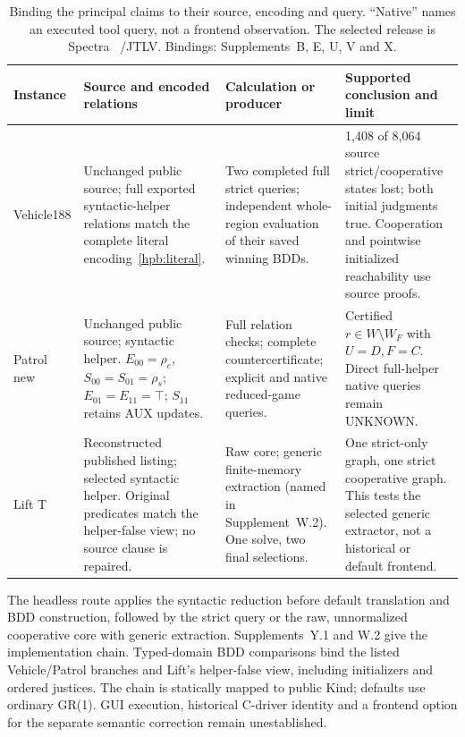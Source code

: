 \begin{table}[t]
\centering\small
\caption{Binding the principal claims to their source, encoding and query.
``Native'' names an executed tool query, not a frontend observation.
The selected release is Spectra~\cite{spectra} /JTLV.
Bindings: Supplements~B, E, U, V and X.}
\label{tab:route-evidence}
\begin{tabular}{@{}L{20mm}L{52mm}L{43mm}L{49mm}@{}}\toprule
Instance & Source and encoded relations & Calculation or producer & Supported conclusion and limit\\\midrule
Vehicle188 & Unchanged public source; full exported syntactic-helper relations match
the complete literal encoding~\eqref{hpb:literal}. &
Two completed full  strict queries; independent whole-region evaluation of their saved winning BDDs. &
1,408 of 8,064 source strict/cooperative states lost; both initial judgments true. Cooperation and pointwise initialized reachability use source proofs.\\[3pt]
Patrol new & Unchanged public source; syntactic helper. $E_{00}=\rho_e$,
$S_{00}=S_{01}=\rho_s$; $E_{01}=E_{11}=\top$; $S_{11}$ retains AUX updates. &
Full relation checks; complete countercertificate; explicit and native reduced-game queries. &
Certified $r\in W\setminus W_F$ with $U=D,F=C$. Direct full-helper native queries remain UNKNOWN.\\[3pt]
Lift T & Reconstructed published listing; selected syntactic helper. Original predicates
match the helper-false view; no source clause is repaired. &
Raw  core; generic finite-memory extraction (named in Supplement~W.2). One solve, two final selections. &
One strict-only graph, one strict cooperative graph. This tests the selected generic extractor, not a historical or default frontend.\\\bottomrule
\end{tabular}
\par\smallskip\raggedright\footnotesize
The headless route applies the syntactic reduction before default
translation and BDD construction, followed by the strict query or the raw,
unnormalized cooperative core with generic extraction. Supplements~Y.1
and W.2 give the implementation chain. Typed-domain BDD comparisons bind
the listed Vehicle/Patrol branches and Lift's helper-false view, including
initializers and ordered justices. The chain is statically mapped to public
Kind; defaults use ordinary GR(1). GUI execution, historical C-driver identity
and a frontend option for the separate semantic correction remain unestablished.
\end{table}
